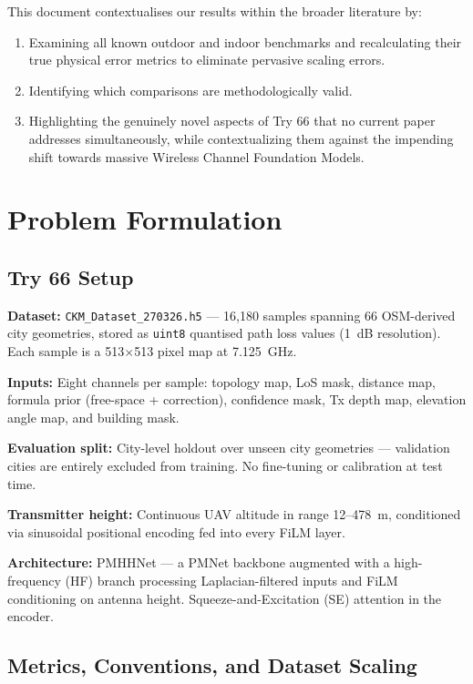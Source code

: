 \documentclass[11pt,a4paper]{article}
\begin{document}
This document contextualises our results within the broader literature by:
\begin{enumerate}[nosep]
    \item Examining all known outdoor and indoor benchmarks and recalculating their true physical error metrics to eliminate pervasive scaling errors.
    \item Identifying which comparisons are methodologically valid.
    \item Highlighting the genuinely novel aspects of Try 66 that no current paper addresses simultaneously, while contextualizing them against the impending shift towards massive Wireless Channel Foundation Models.
\end{enumerate}

\section{Problem Formulation}
\label{sec:problem}

\subsection{Try 66 Setup}

\textbf{Dataset:} \texttt{CKM\_Dataset\_270326.h5} — 16,180 samples spanning 66
OSM-derived city geometries, stored as \texttt{uint8} quantised path loss values (1~dB
resolution). Each sample is a 513$\times$513 pixel map at 7.125~GHz.

\textbf{Inputs:} Eight channels per sample: topology map, LoS mask, distance map,
formula prior (free-space + correction), confidence mask, Tx depth map, elevation
angle map, and building mask.

\textbf{Evaluation split:} City-level holdout over unseen city geometries —
validation cities are entirely excluded from training. No fine-tuning or
calibration at test time.

\textbf{Transmitter height:} Continuous UAV altitude in range 12--478~m, conditioned
via sinusoidal positional encoding fed into every FiLM layer.

\textbf{Architecture:} PMHHNet — a PMNet backbone augmented with a high-frequency
(HF) branch processing Laplacian-filtered inputs and FiLM conditioning on antenna
height. Squeeze-and-Excitation (SE) attention in the encoder.

\subsection{Metrics, Conventions, and Dataset Scaling}
\end{document}
